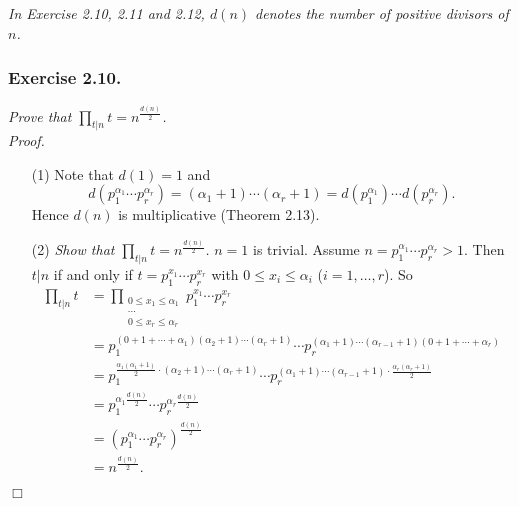 \documentclass{article}
\begin{document}



\emph{In Exercise 2.10, 2.11 and 2.12, $d(n)$ denotes the number of positive divisors of $n$.} \\



\subsubsection*{Exercise 2.10.}
\emph{Prove that $\prod_{t|n} t = n^{\frac{d(n)}{2}}$.} \\



\emph{Proof.}
\begin{enumerate}
\item[(1)]
  Note that
  $d(1) = 1$ and
  \[
    d(p_1^{\alpha_1} \cdots p_r^{\alpha_r})
    = (\alpha_1 + 1) \cdots (\alpha_r + 1)
    = d(p_1^{\alpha_1}) \cdots d(p_r^{\alpha_r}).
  \]
  Hence $d(n)$ is multiplicative (Theorem 2.13).

\item[(2)]
  \emph{Show that $\prod_{t|n} t = n^{\frac{d(n)}{2}}$.}
  $n = 1$ is trivial.
  Assume $n = p_1^{\alpha_1} \cdots p_r^{\alpha_r} > 1$.
  Then $t|n$ if and only if $t = p_1^{x_1} \cdots p_r^{x_r}$
  with $0 \leq x_i \leq \alpha_i$ ($i = 1, \ldots, r$).
  So
  \begin{align*}
    \prod_{t|n} t
    &= \prod_{\substack{0 \leq x_1 \leq \alpha_1 \\ \cdots \\ 0 \leq x_r \leq \alpha_r}}
      p_1^{x_1} \cdots p_r^{x_r} \\
    &= p_1^{(0 + 1 + \cdots + \alpha_1)(\alpha_2 + 1) \cdots (\alpha_r + 1)}
      \cdots
      p_r^{(\alpha_1 + 1) \cdots (\alpha_{r-1} + 1)(0 + 1 + \cdots + \alpha_r)} \\
    &= p_1^{\frac{\alpha_1(\alpha_1 + 1)}{2} \cdot (\alpha_2 + 1) \cdots (\alpha_r + 1)}
      \cdots
      p_r^{(\alpha_1 + 1) \cdots (\alpha_{r-1} + 1) \cdot \frac{\alpha_r(\alpha_r + 1)}{2}} \\
    &= p_1^{\alpha_1 \frac{d(n)}{2}} \cdots p_r^{\alpha_r \frac{d(n)}{2}} \\
    &= (p_1^{\alpha_1} \cdots p_r^{\alpha_r})^{\frac{d(n)}{2}} \\
    &= n^{\frac{d(n)}{2}}.
  \end{align*}
\end{enumerate}
$\Box$ \\\\
\end{document}
